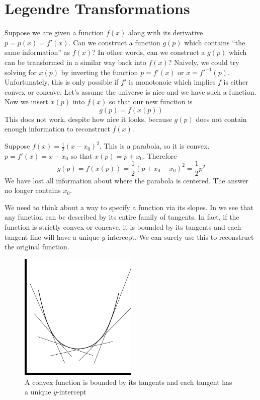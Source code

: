 \documentclass[a4paper,twoside,master.tex]{subfiles}
\begin{document}

\section{Legendre Transformations}
\label{sec:legendre_transformations}

Suppose we are given a function $ f(x) $ along with its derivative $ p = p(x) = f'(x) $. Can we construct a function $ g(p) $ which contains ``the same information'' as $ f(x) $? In other words, can we construct a $ g(p) $ which can be transformed in a similar way back into $ f(x) $? Naively, we could try solving for $ x(p) $ by inverting the function $ p = f'(x) $ or $ x = f'^{-1}(p) $. Unfortunately, this is only possible if $ f' $ is monotonoic which implies $ f $ is either convex or concave. Let's assume the universe is nice and we have such a function. Now we insert $ x(p) $ into $ f(x) $ so that our new function is
\begin{equation}
    g(p) = f(x(p))
\end{equation}
This does not work, despite how nice it looks, because $ g(p) $ does not contain enough information to reconstruct $ f(x) $.
\begin{ex}
    Suppose $ f(x) = \frac{1}{2} (x-x_0)^2 $. This is a parabola, so it is convex. $ p = f'(x) = x-x_0 $ so that $ x(p) = p + x_0 $. Therefore
    \begin{equation}
        g(p) = f(x(p)) = \frac{1}{2} (p+x_0-x_0)^2 = \frac{1}{2} p^2
    \end{equation}
    We have lost all information about where the parabola is centered. The answer no longer contains $ x_0 $.
\end{ex}

We need to think about a way to specify a function via its slopes. In  we see that any function can be described by its entire family of tangents. In fact, if the function is strictly convex or concave, it is bounded by its tangents and each tangent line will have a unique $ y $-intercept. We can surely use this to reconstruct the original function.


\begin{figure}[h]
    \centering
    \includegraphics[width=0.5\textwidth]{figures/lec_13_function_tangents.png}
    \caption{A convex function is bounded by its tangents and each tangent has a unique $ y $-intercept}
    \label{fig:lec_13_convex_tangents}
\end{figure}
\end{document}
